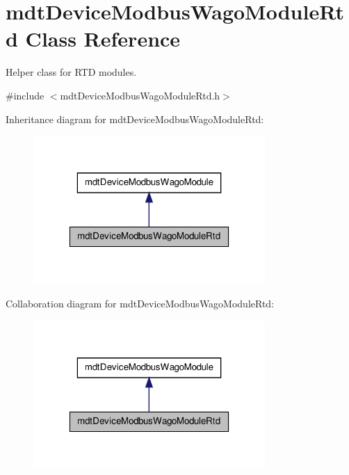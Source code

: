 \hypertarget{classmdt_device_modbus_wago_module_rtd}{\section{mdt\-Device\-Modbus\-Wago\-Module\-Rtd Class Reference}
\label{classmdt_device_modbus_wago_module_rtd}
}


Helper class for R\-T\-D modules.  




{\ttfamily \#include $<$mdt\-Device\-Modbus\-Wago\-Module\-Rtd.\-h$>$}



Inheritance diagram for mdt\-Device\-Modbus\-Wago\-Module\-Rtd\-:\nopagebreak
\begin{figure}[H]
\begin{center}
\leavevmode
\includegraphics[width=250pt]{classmdt_device_modbus_wago_module_rtd__inherit__graph}
\end{center}
\end{figure}


Collaboration diagram for mdt\-Device\-Modbus\-Wago\-Module\-Rtd\-:\nopagebreak
\begin{figure}[H]
\begin{center}
\leavevmode
\includegraphics[width=250pt]{classmdt_device_modbus_wago_module_rtd__coll__graph}
\end{center}
\end{figure}
